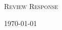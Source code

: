 \begin{titlepage}
{
    \center
    
    \textsc{\Large Review Response}
    \\[0.5cm]
    
    {\Huge \paperTitle}
    
    {\large \today}
    
    \vspace{3.5cm}
}



\end{titlepage}
